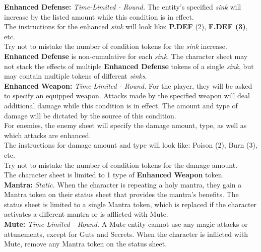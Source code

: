 \documentclass[12pt]{article}
\begin{document}
\begin{multicols*}{2}
\textbf{Enhanced Defense:} \emph{Time-Limited - Round.} The entity’s specified \emph{sink} will increase by the listed amount while this condition is in effect.\\
The instructions for the enhanced \emph{sink} will look like: \textbf{P.DEF} (2), \textbf{F.DEF (3)}, etc.\\
Try not to mistake the number of condition tokens for the \emph{sink} increase.\\
\textbf{Enhanced Defense} is non-cumulative for each \emph{sink}. The character sheet may not stack the effects of multiple \textbf{Enhanced Defense} tokens of a single \emph{sink}, but may contain multiple tokens of different \emph{sinks}.\\

\textbf{Enhanced Weapon:} \emph{Time-Limited - Round.} For the player, they will be asked to specify an equipped weapon. Attacks made by the specified weapon will deal additional damage while this condition is in effect. The amount and type of damage will be dictated by the source of this condition.\\
For enemies, the enemy sheet will specify the damage amount, type, as well as which attacks are enhanced.\\
The instructions for damage amount and type will look like: Poison (2), Burn (3), etc.\\
Try not to mistake the number of condition tokens for the damage amount.\\
The character sheet is limited to 1 type of \textbf{Enhanced Weapon} token.\\

\textbf{Mantra:} \emph{Static.} When the character is repeating a holy mantra, they gain a Mantra token on their status sheet that provides the mantra’s benefits. The status sheet is limited to a single Mantra token, which is replaced if the character activates a different mantra or is afflicted with Mute.\\

\textbf{Mute:} \emph{Time-Limited - Round.} A Mute entity cannot use any magic attacks or attunements, except for Guts and Secrets. When the character is inflicted with Mute, remove any Mantra token on the status sheet.


\end{multicols*}
\end{document}
